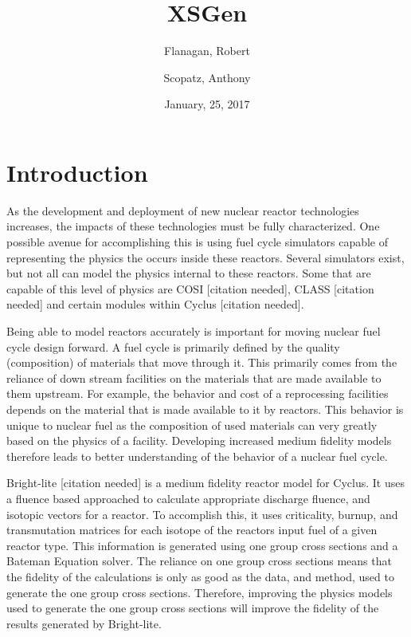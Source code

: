 \documentclass{article}
\begin{document}
\title{XSGen}
\date{January, 25, 2017}
\author{Flanagan, Robert \and Scopatz, Anthony}
\maketitle
\doublespacing

\section{Introduction}
As the development and deployment of new nuclear reactor technologies increases, the impacts of these technologies must be fully characterized. One possible avenue for accomplishing this is using fuel cycle simulators capable of representing the physics the occurs inside these reactors. Several simulators exist, but not all can model the physics internal to these reactors. Some that are capable of this level of physics are COSI [citation needed], CLASS [citation needed] and certain modules within Cyclus [citation needed]. 

Being able to model reactors accurately is important for moving nuclear fuel cycle design forward. A fuel cycle is primarily defined by the quality (composition) of materials that move through it. This primarily comes from the reliance of down stream facilities on the materials that are made available to them upstream. For example, the behavior and cost of a reprocessing facilities depends on the material that is made available to it by reactors. This behavior is unique to nuclear fuel as the composition of used materials can very greatly based on the physics of a facility. Developing increased medium fidelity models therefore leads to better understanding of the behavior of a nuclear fuel cycle. 

Bright-lite [citation needed] is a medium fidelity reactor model for Cyclus. It uses a fluence based approached to calculate appropriate discharge fluence, and isotopic vectors for a reactor. To accomplish this, it uses criticality, burnup, and transmutation matrices for each isotope of the reactors input fuel of a given reactor type. This information is generated using one group cross sections and a Bateman Equation solver. The reliance on one group cross sections means that the fidelity of the calculations is only as good as the data, and method, used to generate the one group cross sections. Therefore, improving the physics models used to generate the one group cross sections will improve the fidelity of the results generated by Bright-lite. 
\end{document}
